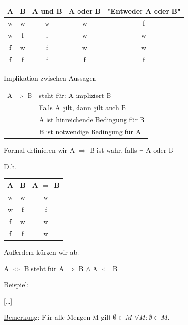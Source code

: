 \documentclass[12pt,a4paper]{article} %
\begin{document}
\begin{tabular}{c | c | c | c | c}
	A & B & A und B & A oder B & "{}Entweder A oder B" \\ \hline
	w & w & w & w & f \\
	w & f & f & w & w \\
	f & w & f & w & w \\
	f & f & f & f & f
\end{tabular}

\underline{Implikation} zwischen Aussagen

\begin{tabular}{l l}
	A $\Rightarrow$ B & steht für: A impliziert B \\
	 & Falls A gilt, dann gilt auch B \\
	 & A ist \underline{hinreichende} Bedingung für B \\
	 & B ist \underline{notwendige} Bedingung für A
\end{tabular}

Formal definieren wir A $\Rightarrow$ B ist wahr, falls $\neg$ A oder B

D.h.
\begin{tabular}{c | c | c}
	A & B & A $\Rightarrow$ B \\ \hline
	w & w & w \\
	w & f & f \\
	f & w & w \\
	f & f & w
\end{tabular}

Außerdem kürzen wir ab:

A $\Leftrightarrow$ B steht für A $\Rightarrow$ B $\land$ A $\Leftarrow$ B

Beispiel:

[\dots]

\underline{Bemerkung}:\newline
Für alle Mengen M gilt $\emptyset \subset M$ \newline
$\forall M: \emptyset \subset M$.
\end{document}
